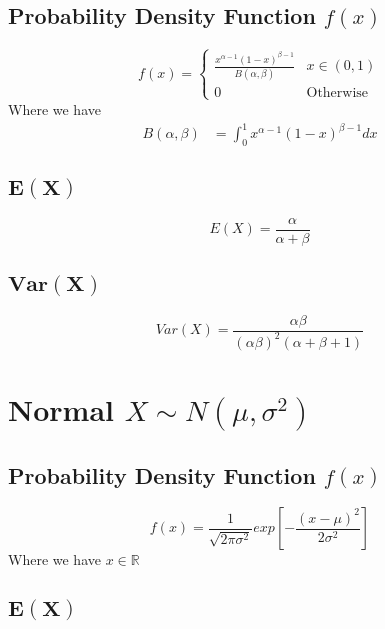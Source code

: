\documentclass[12pt]{article}
\begin{document}
\subsection{Probability Density Function $f(x)$}

\begin{equation*}
  f(x) =
  \begin{cases}
     \frac{x^{\alpha -1} (1-x)^{\beta -1}}{B(\alpha,\beta)} & x \in (0,1) \\
     0 & \text{Otherwise}
  \end{cases}
\end{equation*}
Where we have
\begin{align*}
  B(\alpha,\beta) &= \int_{0}^{1}x^{\alpha -1}(1-x)^{\beta -1} dx
\end{align*}

\subsection{$\bm{E(X)}$}

\begin{equation*}
  E(X) = \frac{\alpha}{\alpha + \beta}
\end{equation*}

\subsection{$\bm{Var(X)}$}

\begin{equation*}
  Var(X)= \frac{\alpha \beta}{(\alpha \beta)^{2} (\alpha + \beta + 1)}
\end{equation*}

\newpage
\section{Normal $X \sim N(\mu,\sigma^{2})$}
\subsection{Probability Density Function $f(x)$}

\begin{equation*}
  f(x) = \frac{1}{\sqrt{2\pi \sigma^{2}}}exp \left [- \frac{(x-\mu)^{2}}{2\sigma^{2}}\right]
\end{equation*}
Where we have $x \in \mathbb{R}$

\subsection{$\bm{E(X)}$}
\end{document}
